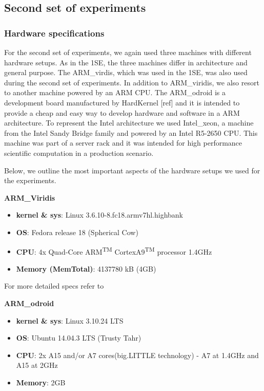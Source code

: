 \subsection{Second set of experiments}

\subsubsection*{Hardware specifications}

For the second set of experiments, we again used three machines with different hardware setups. As in the 1SE, the three machines differ in architecture and general purpose. The ARM\_virdis, which was used in the 1SE, was also used during the second set of experiments. In addition to ARM\_viridis, we also resort to another machine powered by an ARM CPU. The ARM\_odroid is a development board manufactured by HardKernel [ref] and it is intended to provide a cheap and easy way to develop hardware and software in a ARM architecture. To represent the Intel architecture we used Intel\_xeon, a machine from the Intel Sandy Bridge family and powered by an Intel R5-2650 CPU. This machine was part of a server rack and it was intended for high performance scientific computation in a production scenario.

Below, we outline the most important aspects of the hardware setups we used for the experiments.

\vspace{10mm}
\textbf{ARM\_Viridis}
\begin{itemize}
  \item[] \textbf{kernel \& sys}:  Linux  3.6.10-8.fc18.armv7hl.highbank
  \item[] \textbf{OS}: Fedora release 18 (Spherical Cow)
  \item[] \textbf{CPU}:    4x Quad-Core ARM\textsuperscript{TM} CortexA9\textsuperscript{TM} processor \@1.4GHz
  \item[] \textbf{Memory  (MemTotal)}:        4137780 kB (4GB) 
\end{itemize}

For more detailed specs refer to \cite{viridis_specs}


\vspace{10mm}
\textbf{ARM\_odroid}
\begin{itemize}
  \item[] \textbf{kernel \& sys}:  Linux 3.10.24 LTS
  \item[] \textbf{OS}: Ubuntu 14.04.3 LTS (Trusty Tahr)
  \item[] \textbf{CPU}: 2x A15 and/or A7 cores(big.LITTLE technology) - A7 at 1.4GHz and A15 at 2GHz
  \item[] \textbf{Memory}:        2GB
\end{itemize}

